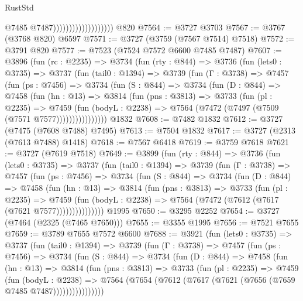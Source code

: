 \begin{lexlean}{RustStd}
\begin{coremodule}
                                          @7485
                                          @7487)))))))))))))))))))
    @820
@7564 := @3727 @3703
@7567 := @3767 (@3768 @820) @6597
@7571 := @3727 (@3759 (@7567 @7514) @7518)
@7572 := @3791 @820
@7577 := @7523 (@7524 @7572 @6600 @7485 @7487)
@7607 := @3896
    (fun (rc : @2235) =>
    @3734
      (fun (rty : @844) =>
      @3736
        (fun (lets0 : @3735) =>
        @3737
          (fun (tail0 : @1394) =>
          @3739
            (fun (Γ : @3738) =>
            @7457
              (fun (ps : @7456) =>
              @3734
                (fun (S : @844) =>
                @3734
                  (fun (D : @844) =>
                  @7458
                    (fun (hn : @13) =>
                    @3814
                      (fun (pns : @3813) =>
                      @3733
                        (fun (pl : @2235) =>
                        @7459
                          (fun (bodyL : @2238) =>
                          @7564 (@7472 (@7497 (@7509 (@7571 @7577))))))))))))))))
    @1832
@7608 := @7482 @1832
@7612 := @3727 (@7475 (@7608 @7488) @7495)
@7613 := @7504 @1832
@7617 := @3727 (@2313 (@7613 @7488) @1418)
@7618 := @7567 @6418
@7619 := @3759 @7618
@7621 := @3727 (@7619 @7518)
@7649 := @3899
    (fun (rty : @844) =>
    @3736
      (fun (lets0 : @3735) =>
      @3737
        (fun (tail0 : @1394) =>
        @3739
          (fun (Γ : @3738) =>
          @7457
            (fun (ps : @7456) =>
            @3734
              (fun (S : @844) =>
              @3734
                (fun (D : @844) =>
                @7458
                  (fun (hn : @13) =>
                  @3814
                    (fun (pns : @3813) =>
                    @3733
                      (fun (pl : @2235) =>
                      @7459
                        (fun (bodyL : @2238) =>
                        @7564 (@7472 (@7612 (@7617 (@7621 @7577)))))))))))))))
    @1995
@7650 := @3295 @2252
@7654 := @3727 (@7464 (@2325 (@7465 @7650)))
@7655 := @3355 @1995
@7656 := @7521 @7655
@7659 := @3789 @7655 @7572 @6600
@7688 := @3921
    (fun (lets0 : @3735) =>
    @3737
      (fun (tail0 : @1394) =>
      @3739
        (fun (Γ : @3738) =>
        @7457
          (fun (ps : @7456) =>
          @3734
            (fun (S : @844) =>
            @3734
              (fun (D : @844) =>
              @7458
                (fun (hn : @13) =>
                @3814
                  (fun (pns : @3813) =>
                  @3733
                    (fun (pl : @2235) =>
                    @7459
                      (fun (bodyL : @2238) =>
                      @7564 (@7654 (@7612 (@7617 (@7621 (@7656 (@7659 @7485 @7487))))))))))))))))

\end{coremodule}
\end{lexlean}
